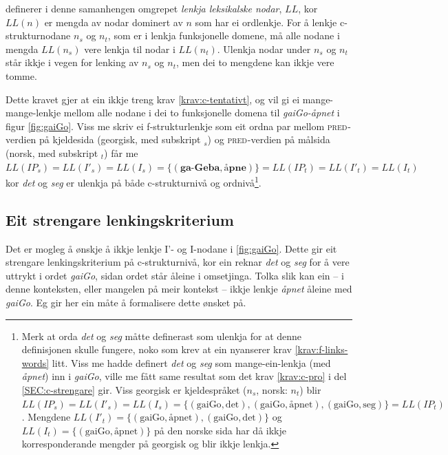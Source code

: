 \documentclass[12pt,a4paper,oneside,draft]{report}
\newcommand{\F}[2]{\textsc{#1}\ensuremath{_{#2}}}
\newcommand{\PRED}{\F{pred}{}}
\begin{document}
\citet[s.~77]{dyvik2009lmp} definerer i denne samanhengen omgrepet
 \emph{lenkja leksikalske nodar}, $LL$, kor $LL(n)$ er mengda av nodar
 dominert av $n$ som har ei ordlenkje. For å lenkje
 c\hyp{}strukturnodane $n_s$ og $n_t$, som er i lenkja funksjonelle
 domene, må alle nodane i mengda $LL(n_s)$ vere lenkja til nodar i
 $LL(n_t)$. Ulenkja nodar under $n_s$ og $n_t$ står ikkje i vegen for
 lenking av $n_s$ og $n_t$, men dei to mengdene kan ikkje vere tomme.

Dette kravet gjer at ein ikkje treng krav \ref{krav:c-tentativt}, og
 vil gi ei mange-mange-lenkje mellom alle nodane i dei to funksjonelle
 domena til \emph{gaiGo-åpnet} i figur \ref{fig:gaiGo}. Viss me skriv ei
 f\hyp{}strukturlenkje som eit ordna par mellom \PRED{}-verdien på
 kjeldesida (georgisk, med subskript $_s$) og \PRED{}-verdien på
 målsida (norsk, med subskript $_t$) får me
 $LL(IP_s)=LL(I'_s)=LL(I_s)=\{(\textbf{ga-Geba},\textbf{åpne})\}=LL(IP_t)=LL(I'_t)=LL(I_t)$
 kor \emph{det} og \emph{seg} er ulenkja på både c\hyp{}strukturnivå og
 ordnivå\footnote{\label{fn:LL-ordlenkje} Merk at orda \emph{det} og \emph{seg} måtte definerast som ulenkja for
        at denne definisjonen skulle fungere, noko som krev at ein nyanserer
        krav \ref{krav:f-links-words} litt. Viss me hadde definert
        \emph{det} og \emph{seg} som mange-ein-lenkja (med \emph{åpnet}) inn i
        \emph{gaiGo}, ville me fått same resultat som det krav
        \ref{krav:c-pro} i del \ref{SEC:c-strengare} gir.
        Viss georgisk er kjeldespråket
        ($n_s$, norsk: $n_t$) blir
        $LL(IP_s)=LL(I'_s)=LL(I_s)=\{(\text{gaiGo},\text{det}),(\text{gaiGo},\text{åpnet}),(\text{gaiGo},\text{seg})\}=LL(IP_t)$.
        Mengdene
        $LL(I'_t)=\{(\text{gaiGo},\text{åpnet}),(\text{gaiGo},\text{det})\}$
        og $LL(I_t)=\{(\text{gaiGo},\text{åpnet})\}$ på den norske
        sida har då ikkje korresponderande mengder på georgisk og blir
        ikkje lenkja. }.

\subsection{Eit strengare lenkingskriterium}
\label{sec-3.7.2}

\label{SEC:c-strengare}

Det er mogleg å ønskje å ikkje lenkje I'- og I-nodane i
 \ref{fig:gaiGo}. Dette gir eit strengare lenkingskriterium på
 c\hyp{}strukturnivå, kor ein reknar \emph{det} og \emph{seg} for å vere uttrykt i
 ordet \emph{gaiGo}, sidan ordet står åleine i omsetjinga. Tolka slik kan
 ein -- i denne konteksten, eller mangelen på meir kontekst -- ikkje
 lenkje \emph{åpnet} åleine med \emph{gaiGo}. Eg gir her ein måte å formalisere
 dette ønsket på.
\end{document}
